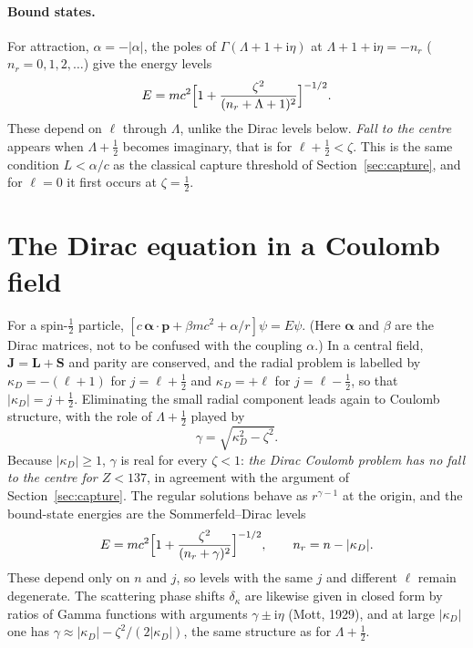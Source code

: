 \documentclass[11pt,a4paper]{book}
\numberwithin{equation}{chapter}
\newcommand{\ii}{\mathrm{i}}
\begin{document}
\paragraph{Bound states.} For attraction, $\alpha=-|\alpha|$, the poles of
$\Gamma(\Lambda+1+\ii\eta)$ at $\Lambda+1+\ii\eta=-n_r$ ($n_r=0,1,2,\dots$) give
the energy levels
\begin{equation}\label{eq:kg-levels}
  E=mc^2\Bigl[1+\frac{\zeta^2}{(n_r+\Lambda+1)^2}\Bigr]^{-1/2}.
\end{equation}
These depend on $\ell$ through $\Lambda$, unlike the Dirac levels below.
\emph{Fall to the centre} appears when $\Lambda+\tfrac12$ becomes imaginary, that
is for $\ell+\tfrac12<\zeta$. This is the same condition $L<\alpha/c$ as the
classical capture threshold of Section~\ref{sec:capture}, and for $\ell=0$ it
first occurs at $\zeta=\tfrac12$.

\section{The Dirac equation in a Coulomb field}\label{sec:dirac}

For a spin-$\tfrac12$ particle,
$[c\,\bm\alpha\cdot\bm p+\beta mc^2+\alpha/r]\psi=E\psi$. (Here $\bm\alpha$ and
$\beta$ are the Dirac matrices, not to be confused with the coupling $\alpha$.)
In a central field, $\bm J=\bm L+\bm S$ and parity are conserved, and the radial
problem is labelled by $\kappa_D=-(\ell+1)$ for $j=\ell+\tfrac12$ and
$\kappa_D=+\ell$ for $j=\ell-\tfrac12$, so that $|\kappa_D|=j+\tfrac12$.
Eliminating the small radial component leads again to Coulomb structure, with the
role of $\Lambda+\tfrac12$ played by
\begin{equation}\label{eq:gamma}
  \gamma=\sqrt{\kappa_D^2-\zeta^2}.
\end{equation}
Because $|\kappa_D|\ge1$, $\gamma$ is real for every $\zeta<1$:
\emph{the Dirac Coulomb problem has no fall to the centre for $Z<137$}, in
agreement with the argument of Section~\ref{sec:capture}. The regular solutions
behave as $r^{\gamma-1}$ at the origin, and the bound-state energies are the
Sommerfeld--Dirac levels
\begin{equation}\label{eq:dirac-levels}
  E=mc^2\Bigl[1+\frac{\zeta^2}{(n_r+\gamma)^2}\Bigr]^{-1/2},\qquad
  n_r=n-|\kappa_D| .
\end{equation}
These depend only on $n$ and $j$, so levels with the same $j$ and different
$\ell$ remain degenerate. The scattering phase shifts $\delta_\kappa$ are
likewise given in closed form by ratios of Gamma functions with arguments
$\gamma\pm\ii\eta$ (Mott, 1929), and at large $|\kappa_D|$ one has
$\gamma\approx|\kappa_D|-\zeta^2/(2|\kappa_D|)$, the same structure as for
$\Lambda+\tfrac12$.
\end{document}
